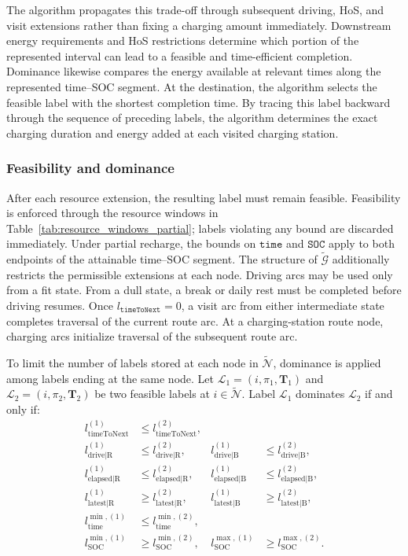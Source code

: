 \documentclass[3p,11pt,authoryear]{elsarticle}  %
\begin{document}
The algorithm propagates this trade-off through subsequent driving,
HoS, and visit extensions rather than fixing a charging amount
immediately. Downstream energy requirements and HoS
restrictions determine which portion of the represented interval can
lead to a feasible and time-efficient completion. Dominance likewise
compares the energy available at relevant times along the represented
time--SOC segment. At the destination, the algorithm selects the feasible label with the shortest completion time. By tracing this label backward through the
sequence of preceding labels, the algorithm determines the exact charging duration and energy added at each visited charging station.




\subsubsection{Feasibility and dominance}

After each resource extension, the resulting label must remain feasible. Feasibility is enforced through the resource windows in Table~\ref{tab:resource_windows_partial}; labels violating any bound are discarded immediately. Under partial recharge, the bounds on \(\texttt{time}\) and \(\texttt{SOC}\) apply to both endpoints of the attainable time--SOC segment. The structure of \(\mathcal{\widetilde{G}}\) additionally restricts the permissible extensions at each node. Driving arcs may be used only from a fit state. From a dull state, a break or daily rest must be completed before driving resumes. Once \(l_{\texttt{timeToNext}}=0\), a visit arc from either intermediate state completes traversal of the current route arc. At a charging-station route node, charging arcs initialize traversal of the subsequent route arc.


To limit the number of labels stored at each node in \(\mathcal{\widetilde{N}}\), dominance is applied among labels ending at the same node. Let \(\mathcal{L}_1=(i,\pi_1,\mathbf{T}_1)\) and \(\mathcal{L}_2=(i,\pi_2,\mathbf{T}_2)\) be two feasible labels at \(i\in\mathcal{\widetilde{N}}\).
 Label $\mathcal{L}_1$ dominates $\mathcal{L}_2$ if and only if:
\begin{align*}
l_{\text{timeToNext}}^{(1)} &\le l_{\text{timeToNext}}^{(2)}, \\
l_{\text{drive|R}}^{(1)} &\le l_{\text{drive|R}}^{(2)}, &
l_{\text{drive|B}}^{(1)} &\le l_{\text{drive|B}}^{(2)}, \\
l_{\text{elapsed|R}}^{(1)} &\le l_{\text{elapsed|R}}^{(2)}, &
l_{\text{elapsed|B}}^{(1)} &\le l_{\text{elapsed|B}}^{(2)}, \\
l_{\text{latest|R}}^{(1)} &\ge l_{\text{latest|R}}^{(2)}, &
l_{\text{latest|B}}^{(1)} &\ge l_{\text{latest|B}}^{(2)}, \\
l_{\text{time}}^{\min,(1)} &\le l_{\text{time}}^{\min,(2)}, \\
l_{\text{SOC}}^{\min,(1)} &\ge l_{\text{SOC}}^{\min,(2)}, &
l_{\text{SOC}}^{\max,(1)} &\ge l_{\text{SOC}}^{\max,(2)}.
\end{align*}
\end{document}
